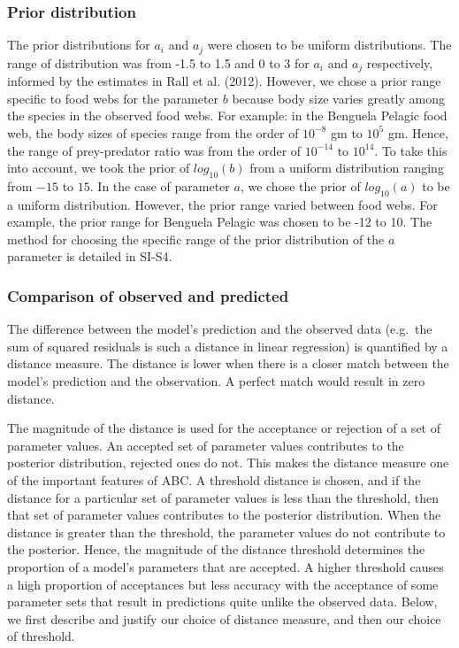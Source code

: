 \documentclass{article}
\begin{document}
\hypertarget{prior-distribution}{%
\subsubsection{Prior distribution}\label{prior-distribution}}

The prior distributions for \(a_i\) and \(a_j\) were chosen to be
uniform distributions. The range of distribution was from -1.5 to 1.5
and 0 to 3 for \(a_i\) and \(a_j\) respectively, informed by the
estimates in Rall et al. (2012). However, we chose a prior range
specific to food webs for the parameter \(b\) because body size varies
greatly among the species in the observed food webs. For example: in the
Benguela Pelagic food web, the body sizes of species range from the
order of \(10^{-8}\) gm to \(10^5\) gm. Hence, the range of
prey-predator ratio was from the order of \(10^{-14}\) to \(10^{14}\).
To take this into account, we took the prior of \(log_{10}(b)\) from a
uniform distribution ranging from \(-15\) to \(15\). In the case of
parameter \(a\), we chose the prior of \(log_{10}(a)\) to be a uniform
distribution. However, the prior range varied between food webs. For
example, the prior range for Benguela Pelagic was chosen to be -12 to
10. The method for choosing the specific range of the prior distribution
of the \(a\) parameter is detailed in SI-S4.

\hypertarget{comparison-of-observed-and-predicted}{%
\subsubsection{Comparison of observed and
predicted}\label{comparison-of-observed-and-predicted}}

The difference between the model's prediction and the observed data
(e.g.~the sum of squared residuals is such a distance in linear
regression) is quantified by a distance measure. The distance is lower
when there is a closer match between the model's prediction and the
observation. A perfect match would result in zero distance.

The magnitude of the distance is used for the acceptance or rejection of
a set of parameter values. An accepted set of parameter values
contributes to the posterior distribution, rejected ones do not. This
makes the distance measure one of the important features of ABC. A
threshold distance is chosen, and if the distance for a particular set
of parameter values is less than the threshold, then that set of
parameter values contributes to the posterior distribution. When the
distance is greater than the threshold, the parameter values do not
contribute to the posterior. Hence, the magnitude of the distance
threshold determines the proportion of a model's parameters that are
accepted. A higher threshold causes a high proportion of acceptances but
less accuracy with the acceptance of some parameter sets that result in
predictions quite unlike the observed data. Below, we first describe and
justify our choice of distance measure, and then our choice of
threshold.
\end{document}
